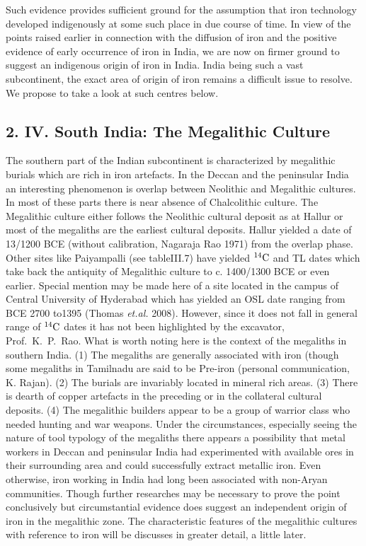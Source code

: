 Such evidence provides sufficient ground for the assumption that iron technology developed indigenously at some such place in due course of time. In view of the points raised earlier in connection with the diffusion of iron and the positive evidence of early occurrence of iron in India, we are now on firmer ground to suggest an indigenous origin of iron in India. India being such a vast subcontinent, the exact area of origin of iron remains a difficult issue to resolve. We propose to take a look at such centres below.

\vspace{-.3cm}

\subsection*{2. IV. South India: The Megalithic Culture}\label{subsection-7}

\vspace{-.2cm}

The southern part of the Indian subcontinent is characterized by megalithic burials which are rich in iron artefacts. In the Deccan and the peninsular India an interesting phenomenon is overlap between Neolithic and Megalithic cultures. In most of these parts there is near absence of Chalcolithic culture. The Megalithic culture either follows the Neolithic cultural deposit as at Hallur or most of the megaliths are the earliest cultural deposits. Hallur yielded a date of 13/1200 BCE (without calibration, Nagaraja Rao 1971) from the overlap phase. Other sites like Paiyampalli (see tableIII.7) have yielded $^{14}{\rm C}$ and TL dates which take back the antiquity of Megalithic culture to c. 1400/1300 BCE or even earlier. Special mention may be made here of a site located in the campus of Central University of Hyderabad which has yielded an OSL date ranging from BCE 2700 to1395 (Thomas \textit{et.al.} 2008). However, since it does not fall in general range of $^{14}{\rm C}$ dates it has not been highlighted by the excavator, Prof.~K.~P.~Rao. What is worth noting here is the context of the megaliths in southern India. (1) The megaliths are generally associated with iron (though some megaliths in Tamilnadu are said to be Pre-iron (personal communication, K. Rajan).  (2) The burials are invariably located in mineral rich areas. (3) There is dearth of copper artefacts in the preceding or in the collateral cultural deposits. (4) The megalithic builders appear to be a group of warrior class who needed hunting and war weapons. Under the circumstances, especially seeing the nature of tool typology of the megaliths there appears a possibility that metal workers in Deccan and peninsular India had experimented with available ores in their surrounding area and could successfully extract metallic iron. Even otherwise, iron working in India had long been associated with non-Aryan communities. Though further researches may be necessary to prove the point conclusively but circumstantial evidence does suggest an independent origin of iron in the megalithic zone. The characteristic features of the megalithic cultures with reference to iron will be discusses in greater detail, a little later.

